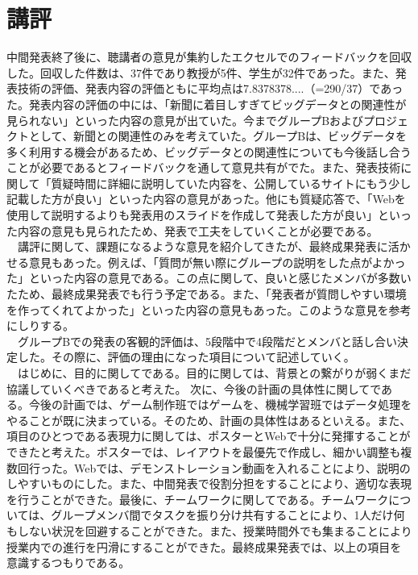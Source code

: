 \section{講評}
中間発表終了後に、聴講者の意見が集約したエクセルでのフィードバックを回収した。回収した件数は、37件であり教授が5件、学生が32件であった。また、発表技術の評価、発表内容の評価ともに平均点は7.8378378....（=290/37）であった。発表内容の評価の中には、「新聞に着目しすぎてビッグデータとの関連性が見られない」といった内容の意見が出ていた。今までグループBおよびプロジェクトとして、新聞との関連性のみを考えていた。グループBは、ビッグデータを多く利用する機会があるため、ビッグデータとの関連性についても今後話し合うことが必要であるとフィードバックを通して意見共有がでた。また、発表技術に関して「質疑時間に詳細に説明していた内容を、公開しているサイトにもう少し記載した方が良い」といった内容の意見があった。他にも質疑応答で、「Webを使用して説明するよりも発表用のスライドを作成して発表した方が良い」といった内容の意見も見られたため、発表で工夫をしていくことが必要である。\\
　講評に関して、課題になるような意見を紹介してきたが、最終成果発表に活かせる意見もあった。例えば、「質問が無い際にグループの説明をした点がよかった」といった内容の意見である。この点に関して、良いと感じたメンバが多数いたため、最終成果発表でも行う予定である。また、「発表者が質問しやすい環境を作ってくれてよかった」といった内容の意見もあった。このような意見を参考にしりする。\\
　グループBでの発表の客観的評価は、5段階中で4段階だとメンバと話し合い決定した。その際に、評価の理由になった項目について記述していく。\\
　はじめに、目的に関してである。目的に関しては、背景との繋がりが弱くまだ協議していくべきであると考えた。 次に、今後の計画の具体性に関してである。今後の計画では、ゲーム制作班ではゲームを、機械学習班ではデータ処理をやることが既に決まっている。そのため、計画の具体性はあるといえる。また、項目のひとつである表現力に関しては、ポスターとWebで十分に発揮することができたと考えた。ポスターでは、レイアウトを最優先で作成し、細かい調整も複数回行った。Webでは、デモンストレーション動画を入れることにより、説明のしやすいものにした。また、中間発表で役割分担をすることにより、適切な表現を行うことができた。最後に、チームワークに関してである。チームワークについては、グループメンバ間でタスクを振り分け共有することにより、1人だけ何もしない状況を回避することができた。また、授業時間外でも集まることにより授業内での進行を円滑にすることができた。最終成果発表では、以上の項目を意識するつもりである。
